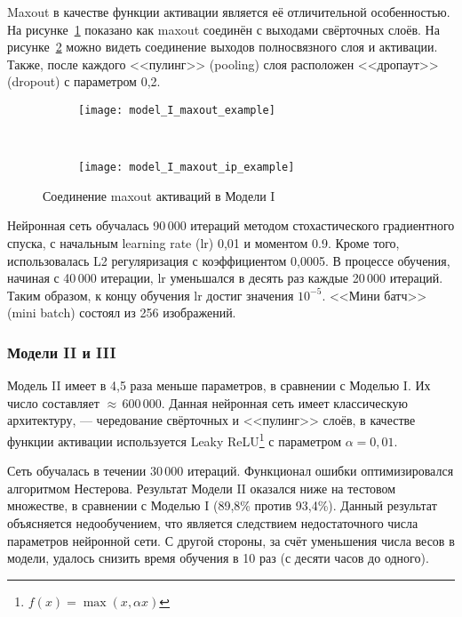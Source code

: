 Maxout в качестве функции активации является её отличительной особенностью.
На рисунке~\ref{fig:model_I_maxout_example} показано как maxout соединён с выходами свёрточных слоёв. На
рисунке~\ref{fig:model_I_maxout_ip_example} можно видеть соединение выходов полносвязного слоя и активации.
Также, после каждого <<пулинг>> (pooling) слоя расположен <<дропаут>> (dropout) с параметром 0,2.
\begin{figure}[h]
    \centering
    \begin{subfigure}[b]{0.5\textwidth}
        \texttt{[image: model\_I\_maxout\_example]}
        \vspace*{0.13cm}
        \subcaption{}
        \label{fig:model_I_maxout_example}
    \end{subfigure}~
    \begin{subfigure}[b]{0.5\textwidth}
        \texttt{[image: model\_I\_maxout\_ip\_example]}
        \subcaption{}
        \label{fig:model_I_maxout_ip_example}
    \end{subfigure}
    \caption{Соединение maxout активаций в Модели I}
    \label{fig:maxout_model_I}
\end{figure}

Нейронная сеть обучалась 90\,000 итераций методом стохастического градиентного спуска,
с начальным learning rate (lr) 0,01 и моментом 0.9. Кроме того, использовалась L2 регуляризация с коэффициентом 0,0005.
В процессе обучения, начиная с 40\,000 итерации, lr уменьшался в десять раз каждые 20\,000 итераций.
Таким образом, к концу обучения lr достиг значения $10^{-5}$. <<Мини батч>> (mini batch) состоял из 256 изображений. 

\subsubsection{Модели II и III}
Модель II имеет в 4,5 раза меньше параметров, в сравнении с Моделью I. Их число составляет $\approx$\,600\,000.
Данная нейронная сеть имеет классическую архитектуру, --- чередование свёрточных и <<пулинг>> слоёв, в качестве
функции активации используется Leaky ReLU\footnote{$f(x) = \max(x, \alpha x)$} с параметром $\alpha = 0,01$.

Сеть обучалась в течении 30\,000 итераций. Функционал ошибки оптимизировался алгоритмом Нестерова.
Результат Модели II оказался ниже на тестовом множестве, в сравнении с Моделью I (89,8\% против 93,4\%).
Данный результат объясняется недообучением, что является следствием недостаточного числа параметров нейронной сети.
С другой стороны, за счёт уменьшения числа весов в модели, удалось снизить время обучения в 10 раз (с десяти часов до одного).

